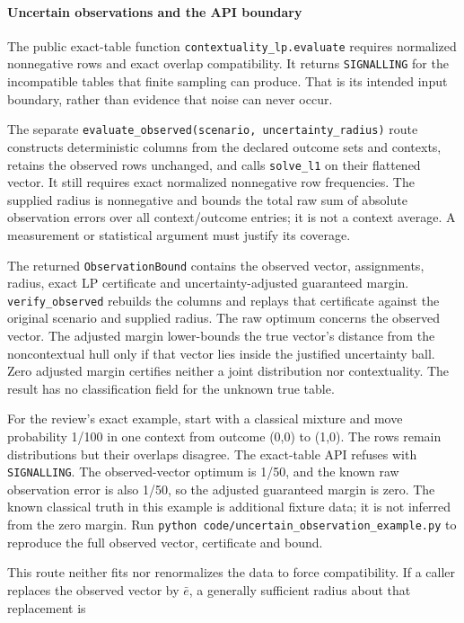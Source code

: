 \documentclass[
  10pt,
]{article}
\begin{document}
\paragraph{Uncertain observations and the API boundary}\label{uncertain-observations-and-the-api-boundary}

The public exact-table function \texttt{contextuality\_lp.evaluate} requires normalized nonnegative rows and exact overlap compatibility. It returns \texttt{SIGNALLING} for the incompatible tables that finite sampling can produce. That is its intended input boundary, rather than evidence that noise can never occur.

The separate \texttt{evaluate\_observed(scenario,\ uncertainty\_radius)} route constructs deterministic columns from the declared outcome sets and contexts, retains the observed rows unchanged, and calls \texttt{solve\_l1} on their flattened vector. It still requires exact normalized nonnegative row frequencies. The supplied radius is nonnegative and bounds the total raw sum of absolute observation errors over all context/outcome entries; it is not a context average. A measurement or statistical argument must justify its coverage.

The returned \texttt{ObservationBound} contains the observed vector, assignments, radius, exact LP certificate and uncertainty-adjusted guaranteed margin. \texttt{verify\_observed} rebuilds the columns and replays that certificate against the original scenario and supplied radius. The raw optimum concerns the observed vector. The adjusted margin lower-bounds the true vector's distance from the noncontextual hull only if that vector lies inside the justified uncertainty ball. Zero adjusted margin certifies neither a joint distribution nor contextuality. The result has no classification field for the unknown true table.

For the review's exact example, start with a classical mixture and move probability 1/100 in one context from outcome (0,0) to (1,0). The rows remain distributions but their overlaps disagree. The exact-table API refuses with \texttt{SIGNALLING}. The observed-vector optimum is 1/50, and the known raw observation error is also 1/50, so the adjusted guaranteed margin is zero. The known classical truth in this example is additional fixture data; it is not inferred from the zero margin. Run \texttt{python\ code/uncertain\_observation\_example.py} to reproduce the full observed vector, certificate and bound.

This route neither fits nor renormalizes the data to force compatibility. If a caller replaces the observed vector by \protect\hypertarget{math-E0034-0039}{}{\(\bar e\)}, a generally sufficient radius about that replacement is
\end{document}
